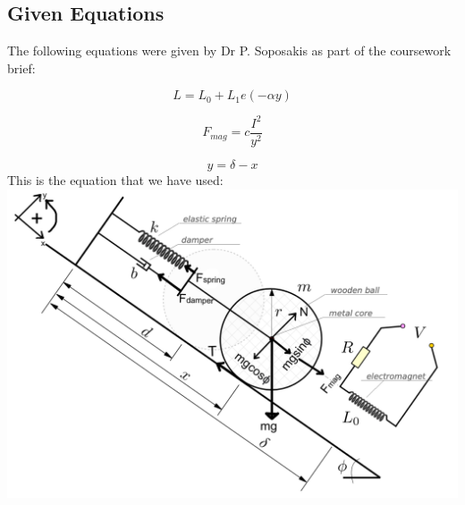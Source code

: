 \subsection*{Given Equations} The following equations were given by Dr P. Soposakis as part of the coursework brief:

\begin{equation} \label{eq:1}
    L = L_0 + L_1 e(-\alpha y)
\end{equation}

\begin{equation} \label{eq:2}
    F_{mag}=c \frac{I^2}{y^2}
\end{equation}

\begin{equation}
    y = \delta - x
    \end{equation}
This is the equation that we have used:\\
\includegraphics[scale=0.6]{Report/figures/main_diagram.png}